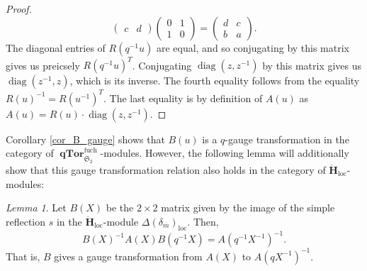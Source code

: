 \documentclass[a4paper]{report}
\theoremstyle{theorem}
\theoremstyle{definition}
\theoremstyle{remark}
\theoremstyle{proposition}
\theoremstyle{conjecture}
\theoremstyle{lemma}
\newtheorem{lemma}{Lemma}
\theoremstyle{corollary}
\theoremstyle{exercise}
\theoremstyle{example}
\newcommand{\on}{\operatorname}
\newcommand{\qTor}{\on{\mathbf{qTor}}}
\begin{document}
\begin{proof}
$$\begin{pmatrix}
          c & d
      \end{pmatrix} \begin{pmatrix}
          0 & 1\\
          1 & 0
      \end{pmatrix}
      = \begin{pmatrix}
          d & c\\ 
          b & a
      \end{pmatrix}.$$
      The diagonal entries of $R(q^{-1}u)$ are equal, and so conjugating by this matrix 
      gives us preicsely $R(q^{-1}u)^T$. Conjugating $\on{diag}(z,z^{-1})$ by this matrix 
      gives us $\on{diag}(z^{-1},z)$, which is its inverse. The fourth equality 
      follows from the equality $R(u)^{-1} = R(u^{-1})^T$. The last equality is by 
      definition of $A(u)$ as $A(u) = R(u) \cdot \on{diag}(z,z^{-1})$.
  \end{proof}
  Corollary \ref{cor_B_gauge} shows that $B(u)$ is a $q$-gauge transformation in the 
  category of $\qTor_{\mathfrak{S}_2}^{\on{fuch}}$-modules. However, the following lemma 
  will additionally show that this gauge transformation relation also holds in the category 
  of $\mathbf{\ddot{\mathbf{H}}}_{\on{loc}}$-modules:
  \begin{lemma}\label{lem_gauge_trans}
      Let $B(X)$ be the $2\times 2$ matrix given by the image of the simple reflection $s$ 
      in the $\mathbf{\ddot{\mathbf{H}}}_{\on{loc}}$-module $\Delta(\delta_m)_{\on{loc}}$. 
      Then, $$B(X)^{-1} A(X) B(q^{-1}X) = A(q^{-1}X^{-1})^{-1}.$$
      That is, $B$ gives a gauge transformation from $A(X)$ to $A(qX^{-1})^{-1}$.
  \end{lemma}
\end{document}
